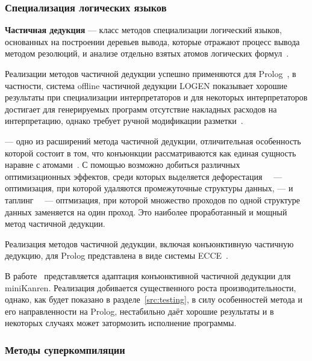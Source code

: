 
\subsubsection{Специализация логических языков}

{\bf Частичная дедукция} --- класс методов специализации логический языков,
основанных на построении деревьев вывода, которые отражают процесс вывода методом
резолюций, и анализе отдельно взятых атомов логических формул~\cite{advanced}.

Реализации методов частичной дедукции успешно применяются для
Prolog~\cite{prologPE},
в частности, система offline частичной дедукции LOGEN
показывает хорошие результаты при специализации интерпретаторов и
для некоторых интерпретаторов достигает для генерируемых программ
отсутствие накладных расходов на интерпретацию,
однако требует ручной модификации разметки~\cite{offlinePD}.

\Cpd --- одно из расширений метода частичной дедукции, отличительная
особенность которой состоит в том, что конъюнкции рассматриваются как
единая сущность наравне с атомами~\cite{cpd}. С помощью \forcpd
возможно добиться различных оптимизационных эффектов, среди которых
выделяется дефорестация~~\cite{deforest}
--- оптимизация, при которой удаляются промежуточные структуры данных, ---
и таплинг~~\cite{tupling}
--- оптмизация, при которой множество проходов по одной структуре данных заменяется на один проход.
Это наиболее проработанный и мощный метод частичной дедукции.


Реализация методов частичной дедукции, включая конъюнктивную частичную дедукцию, для Prolog
представлена в виде системы ECCE~\cite{ecce}.

В работе~\cite{lozov} представляется адаптация конъюнктивной частичной дедукции для miniKanren.
Реализация добивается существенного роста производительности, однако,
как будет показано в разделе~\ref{src:testing}, в силу особенностей метода и его
направленности на Prolog, нестабильно даёт хорошие результаты и
в некоторых случаях может затормозить исполнение программы.

\subsubsection{Методы суперкомпиляции}

